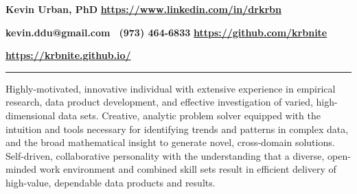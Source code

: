 \documentclass[10pt]{article}
\newcommand{\ressection}[1]{\noindent{\large\textbf{#1}}
\vspace{2pt}\hrule\vspace{4pt}}
\newcommand{\leftandright}[2]{\noindent\textbf{#1}\hfill
\textbf{#2}}
\begin{document}
%

\leftandright{\textbf{\huge{Kevin Urban, PhD}}}
{\url{https://www.linkedin.com/in/drkrbn}}

\leftandright{kevin.ddu@gmail.com \textbullet\, (973) 464-6833}
{\url{https://github.com/krbnite}} 

\leftandright{}
{\url{https://krbnite.github.io/}}





\vspace{0.5cm}
\ressection{Profile}
\noindent Highly-motivated, innovative individual with extensive
experience in empirical research, data product development, and
effective investigation of varied, high-dimensional data sets.
Creative, analytic problem solver equipped with the intuition and tools necessary 
for identifying trends and patterns in complex data, and the broad
mathematical insight to generate novel, cross-domain solutions.
Self-driven, collaborative personality with the understanding that a
diverse, open-minded work environment and combined skill sets
result in efficient delivery of high-value, dependable data products and
results.
\end{document}
